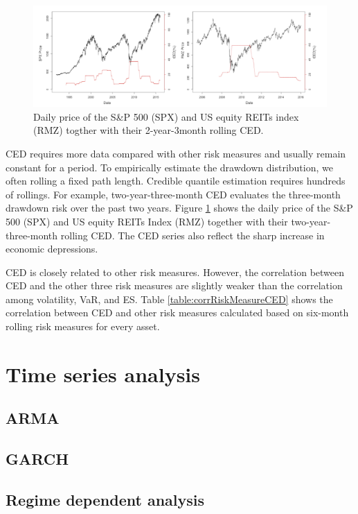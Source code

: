 \documentclass[11pt]{article}
\begin{document}
\begin{figure}
\centering 
\includegraphics[width = 1\textwidth]{../figures/SPX_RMZ_P_CED}
\caption{Daily price of the S\&P 500 (SPX) and US equity REITs index (RMZ) togther with their 2-year-3month rolling CED.} 
\label{fig:SPX_RMZ_P_CED}
\end{figure}

CED requires more data compared with other risk measures and usually remain constant for a period. To empirically estimate the drawdown distribution, we often rolling a fixed path length. Credible quantile estimation requires hundreds of rollings. For example, two-year-three-month CED evaluates the three-month drawdown risk over the past two years. Figure \ref{fig:SPX_RMZ_P_CED} shows the daily price of the S\&P 500 (SPX) and US equity REITs Index (RMZ) together with their two-year-three-month rolling CED. The CED series also reflect the sharp increase in economic depressions.

CED is closely related to other risk measures. However, the correlation between CED and the other three risk measures are slightly weaker than the correlation among volatility, VaR, and ES. Table \ref{table:corrRiskMeasureCED} shows the correlation between CED and other risk measures calculated based on six-month rolling risk measures for every asset. 

\section{Time series analysis}

\subsection{ARMA}

\subsection{GARCH}

\subsection{Regime dependent analysis}
\end{document}
